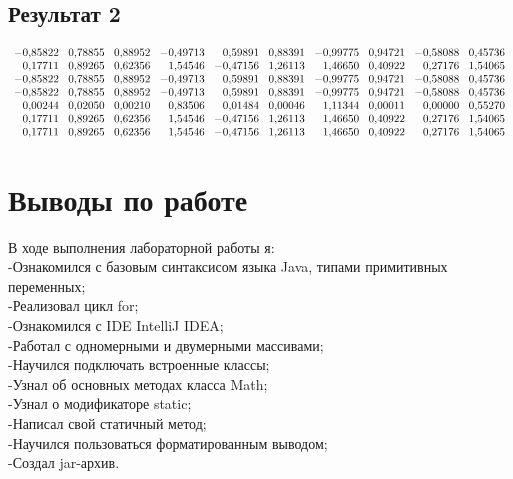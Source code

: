 \subsection{Результат 2}
\[
\normalsize
\begin{array}{r@{\hspace{0.3cm}}r@{\hspace{0.3cm}}r@{\hspace{0.3cm}}r@{\hspace{0.3cm}}r@{\hspace{0.3cm}}r@{\hspace{0.3cm}}r@{\hspace{0.3cm}}r@{\hspace{0.3cm}}r@{\hspace{0.3cm}}r}
 -0{,}85822 & 0{,}78855 & 0{,}88952 & -0{,}49713 & 0{,}59891 & 0{,}88391 & -0{,}99775 & 0{,}94721 & -0{,}58088 & 0{,}45736 \\ 
 0{,}17711 & 0{,}89265 & 0{,}62356 & 1{,}54546 & -0{,}47156 & 1{,}26113 & 1{,}46650 & 0{,}40922 & 0{,}27176 & 1{,}54065 \\ -0{,}85822 & 0{,}78855 & 0{,}88952 & -0{,}49713 & 0{,}59891 & 0{,}88391 & -0{,}99775 & 0{,}94721 & -0{,}58088 & 0{,}45736 \\ 
 -0{,}85822 & 0{,}78855 & 0{,}88952 & -0{,}49713 & 0{,}59891 & 0{,}88391 & -0{,}99775 & 0{,}94721 & -0{,}58088 & 0{,}45736 \\ 
 0{,}00244 & 0{,}02050 & 0{,}00210 & 0{,}83506 & 0{,}01484 & 0{,}00046 & 1{,}11344 & 0{,}00011 & 0{,}00000 & 0{,}55270 \\ 0{,}17711 & 0{,}89265 & 0{,}62356 & 1{,}54546 & -0{,}47156 & 1{,}26113 & 1{,}46650 & 0{,}40922 & 0{,}27176 & 1{,}54065 \\ 0{,}17711 & 0{,}89265 & 0{,}62356 & 1{,}54546 & -0{,}47156 & 1{,}26113 & 1{,}46650 & 0{,}40922 & 0{,}27176 & 1{,}54065
\end{array}
\]

\section{Выводы по работе}
\Large
В ходе выполнения лабораторной работы я: \\
-Ознакомился с базовым синтаксисом языка Java, типами примитивных переменных; \\
-Реализовал цикл for; \\
-Ознакомился с IDE IntelliJ IDEA; \\
-Работал с одномерными и двумерными массивами; \\
-Научился подключать встроенные классы; \\
-Узнал об основных методах класса Math; \\
-Узнал о модификаторе static; \\
-Написал свой статичный метод; \\
-Научился пользоваться форматированным выводом; \\
-Создал jar-архив.

